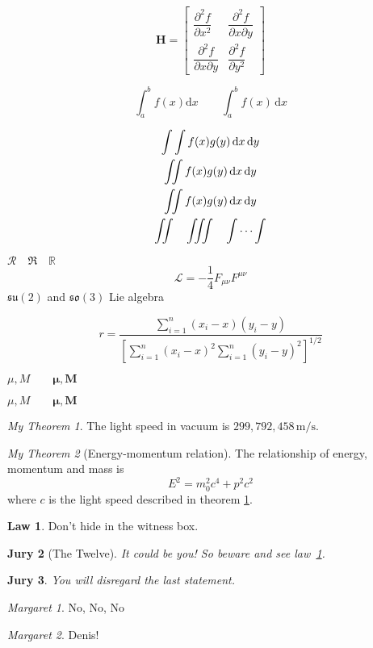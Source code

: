 \documentclass{article}
\theoremstyle{definition} \newtheorem{law}{Law}
\theoremstyle{plain} \newtheorem{jury}[law]{Jury}
\theoremstyle{remark} \newtheorem*{mar}{Margaret}
\begin{document}
\[
\mathbf{H}=
\begin{bmatrix}
\dfrac{\partial^2 f}{\partial x^2} &
\dfrac{\partial^2 f}
{\partial x \partial y} \\[8pt]
\dfrac{\partial^2 f}
{\partial x \partial y} &
\dfrac{\partial^2 f}{\partial y^2}
\end{bmatrix}
\]

\[
\int_a^b f(x)\mathrm{d}x
\qquad
\int_a^b f(x)\,\mathrm{d}x
\]

\newcommand\diff{\,\mathrm{d}}
\begin{gather*}
\int\int f(x)g(y)
\diff x \diff y \\
\int\!\!\!\int
f(x)g(y) \diff x \diff y \\
\iint f(x)g(y) \diff x \diff y \\
\iint\quad \iiint\quad \idotsint
\end{gather*}

$\mathcal{R} \quad \mathfrak{R}
\quad \mathbb{R}$
\[\mathcal{L}
= -\frac{1}{4}F_{\mu\nu}F^{\mu\nu}\]
$\mathfrak{su}(2)$ and
$\mathfrak{so}(3)$ Lie algebra

\[
r = \frac
{\sum_{i=1}^n (x_i- x)(y_i- y)}
{\displaystyle \left[
\sum_{i=1}^n (x_i-x)^2
\sum_{i=1}^n (y_i-y)^2
\right]^{1/2} }
\]

$\mu, M \qquad
\mathbf{\mu}, \mathbf{M}$

$\mu, M \qquad
\boldsymbol{\mu}, \boldsymbol{M}$

\newtheorem{mythm}{My Theorem}[section]
\begin{mythm}\label{thm:light}
The light speed in vacuum
is $299,792,458\,\mathrm{m/s}$.
\end{mythm}
\begin{mythm}[Energy-momentum relation]
The relationship of energy,
momentum and mass is
\[E^2 = m_0^2 c^4 + p^2 c^2\]
where $c$ is the light speed
described in theorem \ref{thm:light}.
\end{mythm}

\begin{law}\label{law:box}
Don't hide in the witness box.
\end{law}
\begin{jury}[The Twelve]
It could be you! So beware and
see law~\ref{law:box}.\end{jury}
\begin{jury}
You will disregard the last
statement.\end{jury}
\begin{mar}No, No, No\end{mar}
\begin{mar}Denis!\end{mar}
\end{document}
